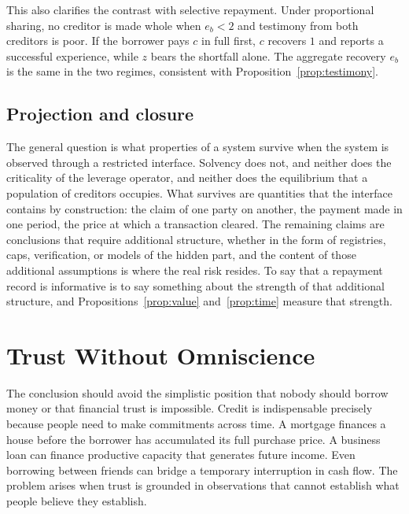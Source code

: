 \documentclass[11pt]{article}
\theoremstyle{definition}
\theoremstyle{remark}
\begin{document}
This also clarifies the contrast with selective repayment. Under proportional sharing, no creditor is made whole when $e_b<2$ and testimony from both creditors is poor. If the borrower pays $c$ in full first, $c$ recovers $1$ and reports a successful experience, while $z$ bears the shortfall alone. The aggregate recovery $e_b$ is the same in the two regimes, consistent with Proposition~\ref{prop:testimony}.

\subsection{Projection and closure}

The general question is what properties of a system survive when the system is observed through a restricted interface. Solvency does not, and neither does the criticality of the leverage operator, and neither does the equilibrium that a population of creditors occupies. What survives are quantities that the interface contains by construction: the claim of one party on another, the payment made in one period, the price at which a transaction cleared. The remaining claims are conclusions that require additional structure, whether in the form of registries, caps, verification, or models of the hidden part, and the content of those additional assumptions is where the real risk resides. To say that a repayment record is informative is to say something about the strength of that additional structure, and Propositions~\ref{prop:value} and~\ref{prop:time} measure that strength.

\section{Trust Without Omniscience}\label{sec:conclusion}

The conclusion should avoid the simplistic position that nobody should borrow money or that financial trust is impossible. Credit is indispensable precisely because people need to make commitments across time. A mortgage finances a house before the borrower has accumulated its full purchase price. A business loan can finance productive capacity that generates future income. Even borrowing between friends can bridge a temporary interruption in cash flow. The problem arises when trust is grounded in observations that cannot establish what people believe they establish.
\end{document}

